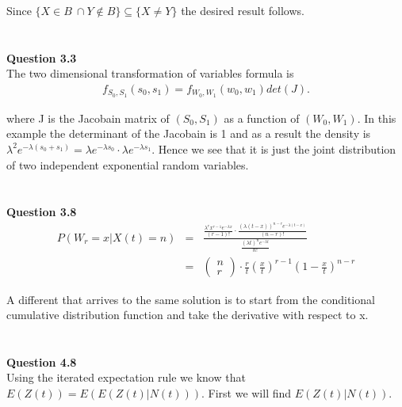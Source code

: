 \documentclass[10pt,a4paper]{article}
\begin{document}
\begin{flushleft}
Since $\{X \in B\ \cap Y \not \in B\} \subseteq  \{X \neq Y\}$ the
desired result follows.


\begin{eqnarray*}
\\
\end{eqnarray*}


\textbf{Question 3.3}\\
The two dimensional transformation of variables formula is
\begin{eqnarray*}
f_{S_0,S_1}(s_0,s_1)=f_{W_0,W_1}(w_0,w_1)det(J).
\end{eqnarray*}

where J is the Jacobain matrix of $(S_0,S_1)$ as a function of
$(W_0,W_1)$. In this example the determinant of the Jacobain is 1
and as a result the density is $\lambda^2 e^{-\lambda
(s_0+s_1)}=\lambda e^{-\lambda s_0} \cdot \lambda e^{-\lambda
s_1}$. Hence we see that it is just the joint distribution of two
independent exponential random variables.



\begin{eqnarray*}
\\
\end{eqnarray*}

\textbf{Question 3.8}\\

\begin{eqnarray*}
P(W_r=x|X(t)=n)&=& \frac{\frac{\lambda^r x^{r-1} e^{-\lambda
x}}{(r-1)!} \cdot \frac{(\lambda(t-x))^{n-r}
e^{-\lambda(t-x)}}{(n-r)!}}{ \frac{(\lambda t)^{n} e^{-\lambda
t}}{n!}}\\
&=& \left ( \begin{array}{c}
 n \\
 r
\end{array} \right) \cdot \frac{r}{t} (\frac{x}{t})^{r-1}
(1-\frac{x}{t})^{n-r}
\end{eqnarray*}

A different that arrives to the same solution is to start from the
conditional cumulative distribution function and take the
derivative with respect to x.



\begin{eqnarray*}
\\
\end{eqnarray*}

\textbf{Question 4.8}\\

Using the iterated expectation rule we know that
$E(Z(t))=E(E(Z(t)|N(t)))$. First we will find $E(Z(t)|N(t))$.


\end{flushleft}
\end{document}
